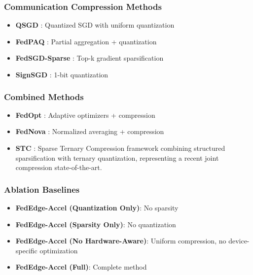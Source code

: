 \documentclass[journal]{IEEEtran}
\begin{document}
\subsubsection{Communication Compression Methods}

\begin{itemize}
    \item \textbf{QSGD} \cite{alistarh2017qsgd}: Quantized SGD with uniform quantization
    \item \textbf{FedPAQ} \cite{reisizadeh2020fedpaq}: Partial aggregation + quantization
    \item \textbf{FedSGD-Sparse} \cite{konevcny2016federated}: Top-k gradient sparsification
    \item \textbf{SignSGD} \cite{bernstein2018signsgd}: 1-bit quantization
\end{itemize}

\subsubsection{Combined Methods}

\begin{itemize}
    \item \textbf{FedOpt} \cite{reddi2020adaptive}: Adaptive optimizers + compression
    \item \textbf{FedNova} \cite{wang2020tackling}: Normalized averaging + compression
    \item \textbf{STC} \cite{sattler2019robust}: Sparse Ternary Compression framework combining structured sparsification with ternary quantization, representing a recent joint compression state-of-the-art.
\end{itemize}

\subsubsection{Ablation Baselines}

\begin{itemize}
    \item \textbf{FedEdge-Accel (Quantization Only)}: No sparsity
    \item \textbf{FedEdge-Accel (Sparsity Only)}: No quantization
    \item \textbf{FedEdge-Accel (No Hardware-Aware)}: Uniform compression, no device-specific optimization
    \item \textbf{FedEdge-Accel (Full)}: Complete method
\end{itemize}
\end{document}
